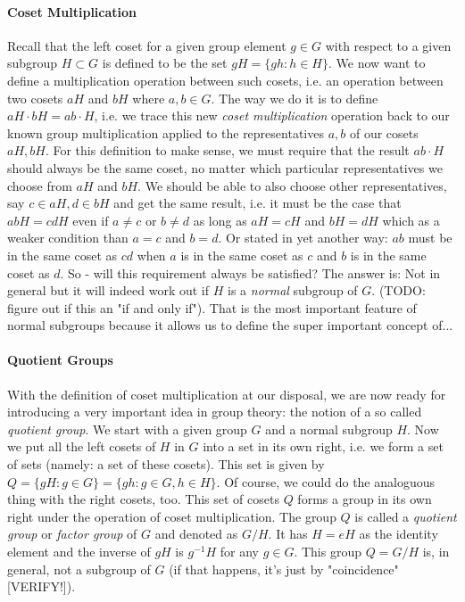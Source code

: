 
\paragraph{Coset Multiplication}
Recall that the left coset for a given group element $g \in G$ with respect to a given subgroup $H \subset G$ is defined to be the set $g H = \{ g h : h \in H \}$. We now want to define a multiplication operation between such cosets, i.e. an operation between two cosets $a H$ and $b H$ where $a,b \in G$. The way we do it is to define $a H \cdot b H = a b \cdot H$, i.e. we trace this new \emph{coset multiplication} operation back to our known group multiplication applied to the representatives $a, b$ of our cosets $a H, b H$. For this definition to make sense, we must require that the result $ab \cdot H$ should always be the same coset, no matter which particular representatives we choose from $aH$ and $bH$. We should be able to also choose other representatives, say $c \in a H, d \in b H$ and get the same result, i.e. it must be the case that $a b H = c d H$ even if $a \neq c$ or $b \neq d$ as long as $a H = c H$ and $b H = d H$ which as a weaker condition than $a = c$ and $b = d$. Or stated in yet another way:  $ab$ must be in the same coset as $cd$ when $a$ is in the same coset as $c$ and $b$ is in the same coset as $d$. So - will this requirement always be satisfied? The answer is: Not in general but it will indeed work out if $H$ is a \emph{normal} subgroup of $G$. (TODO: figure out if this an "if and only if"). That is the most important feature of normal subgroups because it allows us to define the super important concept of...

\paragraph{Quotient Groups}
With the definition of coset multiplication at our disposal, we are now ready for introducing a very important idea in group theory: the notion of a so called \emph{quotient group}. We start with a given group $G$ and a normal subgroup $H$. Now we put all the left cosets of $H$ in $G$ into a set in its own right, i.e. we form a set of sets (namely: a set of these cosets). This set is given by $Q = \{ g H : g \in G \} =  \{ g h : g \in G, h \in H \}$. Of course, we could do the analoguous thing with the right cosets, too. This set of cosets $Q$ forms a group in its own right under the operation of coset multiplication. The group $Q$ is called a \emph{quotient group} or \emph{factor group} of $G$ and denoted as $G / H$. It has $H = e H$ as the identity element and the inverse of $g H$ is $g^{-1} H$ for any $g \in G$. This group $Q = G / H$ is, in general, not a subgroup of $G$ (if that happens, it's just by "coincidence" [VERIFY!]).

